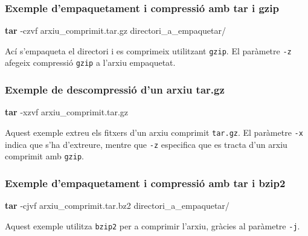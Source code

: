 \documentclass[
  12 pt,
  a4paper,
]{article}
\newenvironment{Shaded}{\begin{snugshade}}{\end{snugshade}}
\newcommand{\AttributeTok}[1]{\textcolor[rgb]{0.13,0.29,0.53}{#1}}
\newcommand{\FunctionTok}[1]{\textcolor[rgb]{0.13,0.29,0.53}{\textbf{#1}}}
\newcommand{\NormalTok}[1]{#1}
\begin{document}
\subsubsection{Exemple d'empaquetament i compressió amb tar i
gzip}\label{exemple-dempaquetament-i-compressiuxf3-amb-tar-i-gzip}

\begin{Shaded}
\begin{Highlighting}[]
\FunctionTok{tar} \AttributeTok{{-}czvf}\NormalTok{ arxiu\_comprimit.tar.gz directori\_a\_empaquetar/}
\end{Highlighting}
\end{Shaded}

Ací s'empaqueta el directori i es comprimeix utilitzant \texttt{gzip}.
El paràmetre \texttt{-z} afegeix compressió \texttt{gzip} a l'arxiu
empaquetat.

\subsubsection{Exemple de descompressió d'un arxiu
tar.gz}\label{exemple-de-descompressiuxf3-dun-arxiu-tar.gz}

\begin{Shaded}
\begin{Highlighting}[]
\FunctionTok{tar} \AttributeTok{{-}xzvf}\NormalTok{ arxiu\_comprimit.tar.gz}
\end{Highlighting}
\end{Shaded}

Aquest exemple extreu els fitxers d'un arxiu comprimit \texttt{tar.gz}.
El paràmetre \texttt{-x} indica que s'ha d'extreure, mentre que
\texttt{-z} especifica que es tracta d'un arxiu comprimit amb
\texttt{gzip}.

\subsubsection{Exemple d'empaquetament i compressió amb tar i
bzip2}\label{exemple-dempaquetament-i-compressiuxf3-amb-tar-i-bzip2}

\begin{Shaded}
\begin{Highlighting}[]
\FunctionTok{tar} \AttributeTok{{-}cjvf}\NormalTok{ arxiu\_comprimit.tar.bz2 directori\_a\_empaquetar/}
\end{Highlighting}
\end{Shaded}

Aquest exemple utilitza \texttt{bzip2} per a comprimir l'arxiu, gràcies
al paràmetre \texttt{-j}.
\end{document}
